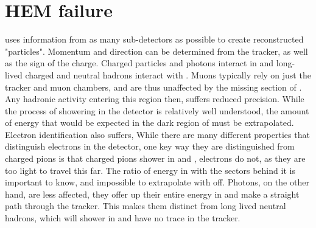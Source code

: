 \section{HEM failure}
\label{sec:HEMfailure}
\CMS uses information from as many sub-detectors as possible to create reconstructed "particles".  Momentum and direction can be determined from the tracker, as well as the sign of the charge.  Charged particles and photons interact in \ECAL and long-lived charged and neutral hadrons interact with \HCAL. Muons typically rely on just the tracker and muon chambers, and are thus unaffected by the missing section of \HCAL.  Any hadronic activity entering this region then, suffers reduced precision.  While the process of showering in the detector is relatively well understood, the amount of energy that would be expected in the dark region of \HCAL must be extrapolated.  Electron identification also suffers, While there are many different properties that distinguish electrons in the detector, one key way they are distinguished from charged pions is that charged pions shower in \ECAL and \HCAL, electrons do not, as they are too light to travel this far.  The ratio of energy in \ECAL with the \HCAL sectors behind it is important to know, and impossible to extrapolate with \HCAL off.  Photons, on the other hand, are less affected, they offer up their entire energy in \ECAL and make a straight path through the tracker.  This makes them distinct from long lived neutral hadrons, which will shower in \HCAL and have no trace in the tracker.
